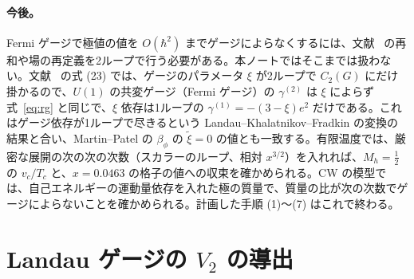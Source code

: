 \documentclass[a4paper,10pt]{ltjsarticle}
\begin{document}
\paragraph{今後。}Fermi ゲージで極値の値を $O(\hbar^2)$ までゲージによらなくするには、文献~\cite{egk16} の再和や場の再定義を2ループで行う必要がある。本ノートではそこまでは扱わない。文献~\cite{lwx03} の式 (23) では、ゲージのパラメータ $\xi$ が2ループで $C_2(G)$ にだけ掛かるので、$U(1)$ の共変ゲージ（Fermi ゲージ）の $\gamma^{(2)}$ は $\xi$ によらず式~\eqref{eq:rg} と同じで、$\xi$ 依存は1ループの $\gamma^{(1)}=-(3-\xi)e^2$ だけである。これはゲージ依存が1ループで尽きるという Landau--Khalatnikov--Fradkin の変換の結果と合い、Martin--Patel の $\beta_\phi$ の $\tilde\xi=0$ の値とも一致する。有限温度では、厳密な展開の次の次の次数（スカラーのループ、相対 $x^{3/2}$）を入れれば、$M_h=\frac12$ の $v_c/T_c$ と、$x=0.0463$ の格子の値への収束を確かめられる。CW の模型では、自己エネルギーの運動量依存を入れた極の質量で、質量の比が次の次数でゲージによらないことを確かめられる。計画した手順 (1)〜(7) はこれで終わる。

\appendix

\section{Landau ゲージの $V_2$ の導出}\label{app:v2}
\end{document}
